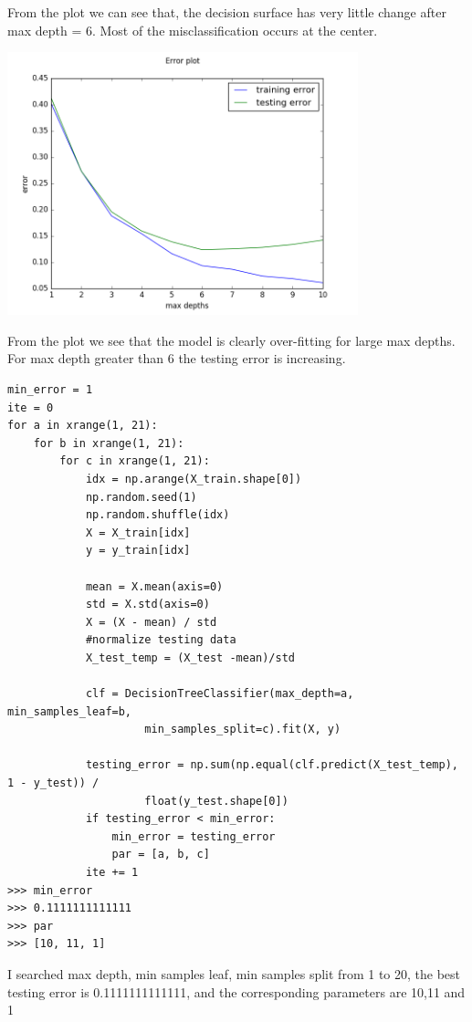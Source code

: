 \documentclass{article}
\newenvironment{sub}[2][$-$]{\begin{trivlist}
		\item[\hskip \labelsep {\bfseries #1}\hskip \labelsep {\bfseries #2.}]}  {\end{trivlist}}
\begin{document}
From the plot we can see that, the decision surface has very little change after max depth = 6. Most of the misclassification occurs at the center. 


\begin{sub}{2.1.3}
\end{sub}

\begin{center}
\includegraphics[width = 4in]{2_1_3}
\end{center}

From the plot we see that the model is clearly over-fitting for large max depths. For max depth greater than 6 the testing error is increasing.  

\begin{sub}{2.1.4}
\end{sub}

\begin{verbatim}
min_error = 1
ite = 0
for a in xrange(1, 21):
    for b in xrange(1, 21):
        for c in xrange(1, 21):
            idx = np.arange(X_train.shape[0])
            np.random.seed(1)
            np.random.shuffle(idx)
            X = X_train[idx]
            y = y_train[idx]

            mean = X.mean(axis=0)
            std = X.std(axis=0)
            X = (X - mean) / std
            #normalize testing data
            X_test_temp = (X_test -mean)/std

            clf = DecisionTreeClassifier(max_depth=a, min_samples_leaf=b,
            		 min_samples_split=c).fit(X, y)

            testing_error = np.sum(np.equal(clf.predict(X_test_temp), 1 - y_test)) /
            		 float(y_test.shape[0])
            if testing_error < min_error:
                min_error = testing_error
                par = [a, b, c]
            ite += 1
>>> min_error
>>> 0.1111111111111
>>> par
>>> [10, 11, 1]
\end{verbatim}
I searched max depth, min samples leaf, min samples split from 1 to 20, the best testing error is  0.1111111111111, and the corresponding parameters are 10,11 and 1
\end{document}
